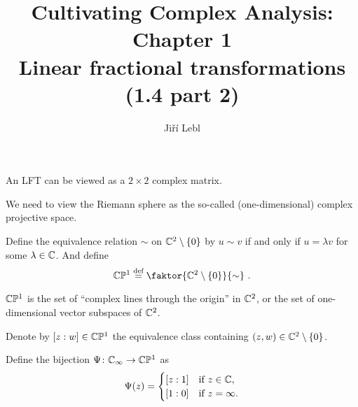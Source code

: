 \documentclass[10pt,aspectratio=169]{beamer}
\author{Ji\v{r}\'i Lebl}
\institute[OSU]{%
Departemento pri Matematiko de Oklahoma {\^S}tata Universitato}
\title{Cultivating Complex Analysis: Chapter 1\\%
Linear fractional transformations (1.4 part 2)}
\date{}
\begin{document}
\begin{frame}
\titlepage
\end{frame}

\begin{frame}
An LFT can be viewed as a $2 \times 2$ complex matrix.

\medskip
\pause

We need to view the Riemann sphere as the so-called (one-dimensional)
complex projective space.

\medskip
\pause

Define the equivalence relation $\sim$ on ${\mathbb{C}}^2 \setminus \{ 0 \}$ by
$u \sim v$ if and only if $u = \lambda v$ for some $\lambda \in {\mathbb{C}}$.
And define
\[
\C \bP^1
\overset{\text{def}}{=}
\faktor{\C^2 \setminus \{ 0\}}{\sim} \ .
\]

\pause

${\mathbb{C}} {\mathbb{P}}^1$ is the set of ``complex lines through the
origin'' in ${\mathbb{C}}^2$, or the set of one-dimensional vector subspaces of ${\mathbb{C}}^2$.

\medskip
\pause

Denote by $[z:w] \in {\mathbb{C}} {\mathbb{P}}^1$ the equivalence class containing
$(z,w) \in {\mathbb{C}}^2 \setminus \{0\}$.

\medskip
\pause

Define the bijection $\Psi \colon {\mathbb{C}}_\infty \to {\mathbb{C}} {\mathbb{P}}^1$ as
\begin{equation*}
\Psi(z) =
\begin{cases}
[z:1] & \text{if } z \in {\mathbb{C}} , \\
[1:0] & \text{if } z=\infty .
\end{cases}
\end{equation*}

\end{frame}
\end{document}
